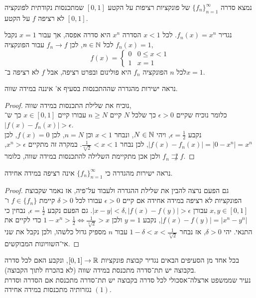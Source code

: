 \question{}
נמצא סדרה ${\{ f_n \}}_{n = 1}^\infty$ של פונקציות רציפות על הקטע $[0, 1]$ שמתכנסות נקודתית לפונקציה לא רציפה $f$ על הקטע $[0, 1]$.
\begin{solution}
	נגדיר $f_n(x) = x^n$.
	לכל $x < 1$ הסדרה $x^n$ היא סדרה אפסה, אך עבור $x = 1$ נקבל $f_n(x) = 1$ לכל $n \in \mathbb{N}$, לכן $f_n \to f$ עבור הפונקציה,
	\[
		f(x)
		= \begin{cases}
			0 & 0 \le x < 1 \\
			1 & x = 1
		\end{cases}
	\]
	לכל $n$ הפונקציה $f_n$ היא פולינום ובפרט רציפה, אבל $f$ לא רציפה ב־$x = 1$.
\end{solution}

\subquestion{}
נראה ישירות מהגדרה שההתכנסות בסעיף א' איננה במידה שווה.
\begin{proof}
	נוכיח את שלילת התכנסות במידה שווה, \\
	כלומר נוכיח שקיים $\epsilon > 0$ כך שלכל $N$ קיים $n \ge N$ עבורו קיים $x \in [0, 1]$ כך ש־$|f(x) - f_n(x)| > \epsilon$. \\
	נקבע $\epsilon = \frac{1}{2}$, ויהי $N \in \mathbb{N}$, ונבחר $x < 1$ וכן $n = N$, לכן $f(x) = 0$, לכן $|f(x) - f_n(x)| = |0 - x^n| = x^n$, לכן נבחר $\frac{1}{\sqrt[n]{2}} < x < 1$.
	במקרה זה מתקיים $x^n > \epsilon$, ולכן אכן מתקיימת השלילה להתכנסות במידה שווה, כלומר $f_n \not\rightrightarrows f$.
\end{proof}

\subquestion{}
נראה ישירות מהגדרה כי ${\{ f_n \}}_{n = 1}^\infty$ אינה רציפה במידה אחידה.
\begin{proof}
	גם הפעם נרצה להבין את שלילת ההגדרה ולעבוד על־פיה,
	אז נאמר שקבוצת הפונקציות לא רציפה במידה אחידה אם קיים $\epsilon > 0$ עבורו לכל $\delta > 0$ קיימת $f \in \{ f_n \}$ ו־$x, y \in [0, 1]$ עבורן $|x - y| < \delta, |f(x) - f(y)| > \epsilon$.
	גם הפעם נקבע $\epsilon = \frac{1}{2}$, נבחין כי $|f(x) - f(y)| = |x^n - y^n|$, נקבע $y = 1$ ולכן $1 - x^n > \frac{1}{2} \iff \frac{1}{\sqrt[n]{2}} > x$ כדי לקיים את התנאי.
	יהי $\delta > 0$, אז נבחר $1 - \delta < x < \frac{1}{\sqrt[n]{2}}$ עבור $n$ מספיק גדול כלשהו, ולכן נקבל את שני אי־השוויונות המבוקשים.
\end{proof}

\question{}
בכל אחד מן הסעיפים הבאים נגדיר קבוצת פונקציות $[0, 1] \to \mathbb{R}$, ונקבע האם לכל סדרה בקבוצה יש תת־סדרה מתכנסת במידה שווה (לא בהכרח לתוך הקבוצה). \\
נעיר שממשפט ארצלה־אסכולי לכל סדרה בקבוצה יש תת־סדרה מתכנסת אם הסדרה וסדרת נגזרותיה מתכנסות במידה אחידה $(1)$.

